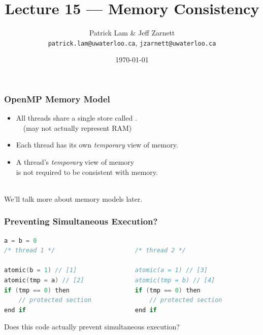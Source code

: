 

\title{Lecture 15 --- Memory Consistency}

\author{Patrick Lam \& Jeff Zarnett\\ \small \texttt{patrick.lam@uwaterloo.ca}, \texttt{jzarnett@uwaterloo.ca}}
\date{\today}




\begin{frame}
  \titlepage

 \end{frame}

\begin{frame}
  \frametitle{OpenMP Memory Model}

  \begin{changemargin}{1cm}
\large

  \begin{itemize}
    \item All threads share a single store called
      .\\ ~~(may not actually represent RAM)\\[1em]
    \item Each thread has its own {\it temporary} view of memory.\\[1em]
    \item A thread's {\it temporary} view of memory\\ is not required to be
      consistent with memory.
  \end{itemize}~\\

  We'll talk more about memory models later.
  \end{changemargin}
  
\end{frame}

\begin{frame}[fragile]
  \frametitle{Preventing Simultaneous Execution?}

  \begin{lstlisting}[language=C,morekeywords={foreach,pragma,omp,parallel,single,nowait,task,untied,barrier,taskyield,mergeable,final,taskwait,critical}]
                    a = b = 0
/* thread 1 */                      /* thread 2 */

atomic(b = 1) // [1]                atomic(a = 1) // [3]
atomic(tmp = a) // [2]              atomic(tmp = b) // [4]
if (tmp == 0) then                  if (tmp == 0) then
    // protected section                // protected section
end if                              end if
  \end{lstlisting}


\large
 Does this code actually prevent simultaneous execution?

  
\end{frame}

